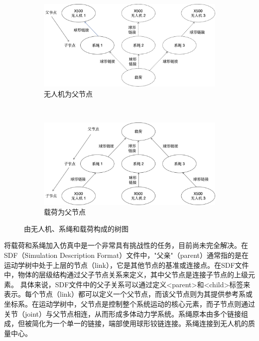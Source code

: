 \documentclass[lang=chs, degree=master, blindreview=false, winfonts=true]{yanputhesis}
\begin{document}
\begin{figure}[hbt!]
	\centering
	\begin{subfigure}[t]{0.9\textwidth}
		\centering
		\includegraphics[width=\textwidth]{picture/tree2.png}
		\caption{无人机为父节点}
		\label{tree1}
	\end{subfigure}\\[2ex] %
	\begin{subfigure}[t]{0.9\textwidth}
		\centering
		\includegraphics[width=\textwidth]{picture/tree1.png}
		\caption{载荷为父节点}
		\label{tree2}
	\end{subfigure}
	\caption{由无人机、系绳和载荷构成的树图}
	\label{tree_combined}
\end{figure}

将载荷和系绳加入仿真中是一个非常具有挑战性的任务，目前尚未完全解决。在SDF（Simulation Description Format）文件中，"父亲"（parent）通常指的是在运动学树中处于上层的节点（link），它是其他节点的基准或连接点。在SDF文件中，物体的层级结构通过父子节点关系来定义，其中父节点是连接子节点的上级元素。
具体来说，SDF文件中的父子关系可以通过定义<parent>和<child>标签来表示。每个节点（link）都可以定义一个父节点，而该父节点则为其提供参考系或坐标系。在运动学树中，父节点是控制整个系统运动的核心元素，而子节点则通过关节（joint）与父节点相连，从而形成多体动力学系统。系绳原本由多个链接组成，但被简化为一个单一的链接，端部使用球形铰链连接。系绳连接到无人机的质量中心。
\end{document}
